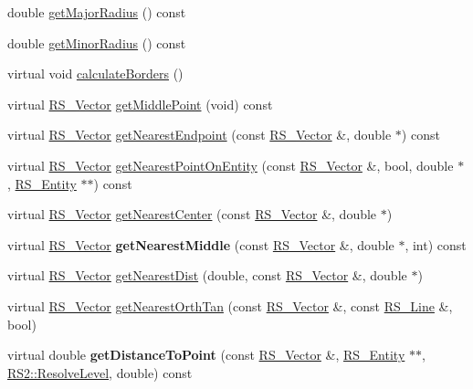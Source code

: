 \begin{DoxyCompactItemize}
\item 
double \hyperlink{classLC__Hyperbola_ae6d62b9293b9de0f4a18c114083c060c}{get\-Major\-Radius} () const 
\item 
double \hyperlink{classLC__Hyperbola_abdc0880b6b9c2dcd4f68156dffd4906f}{get\-Minor\-Radius} () const 
\item 
virtual void \hyperlink{classLC__Hyperbola_a718af461b395258a27b6de2f976ed87e}{calculate\-Borders} ()
\item 
virtual \hyperlink{classRS__Vector}{R\-S\-\_\-\-Vector} \hyperlink{classLC__Hyperbola_ad5b382341417bae845ef0ab55c9908db}{get\-Middle\-Point} (void) const 
\item 
virtual \hyperlink{classRS__Vector}{R\-S\-\_\-\-Vector} \hyperlink{classLC__Hyperbola_adaca6f5f2bb2522a4c504dad6e611583}{get\-Nearest\-Endpoint} (const \hyperlink{classRS__Vector}{R\-S\-\_\-\-Vector} \&, double $\ast$) const 
\item 
virtual \hyperlink{classRS__Vector}{R\-S\-\_\-\-Vector} \hyperlink{classLC__Hyperbola_a1c71e7f4c0221bb03f644028264823f9}{get\-Nearest\-Point\-On\-Entity} (const \hyperlink{classRS__Vector}{R\-S\-\_\-\-Vector} \&, bool, double $\ast$, \hyperlink{classRS__Entity}{R\-S\-\_\-\-Entity} $\ast$$\ast$) const 
\item 
virtual \hyperlink{classRS__Vector}{R\-S\-\_\-\-Vector} \hyperlink{classLC__Hyperbola_ab9a1d8ffb643ab8e0f4f1516b4beafb5}{get\-Nearest\-Center} (const \hyperlink{classRS__Vector}{R\-S\-\_\-\-Vector} \&, double $\ast$)
\item 
\hypertarget{classLC__Hyperbola_a24a99e689222cd41956af9038d6ad8c9}{virtual \hyperlink{classRS__Vector}{R\-S\-\_\-\-Vector} {\bfseries get\-Nearest\-Middle} (const \hyperlink{classRS__Vector}{R\-S\-\_\-\-Vector} \&, double $\ast$, int) const }\label{classLC__Hyperbola_a24a99e689222cd41956af9038d6ad8c9}

\item 
virtual \hyperlink{classRS__Vector}{R\-S\-\_\-\-Vector} \hyperlink{classLC__Hyperbola_a20493a5014ecd93b398ff84ba9731a1a}{get\-Nearest\-Dist} (double, const \hyperlink{classRS__Vector}{R\-S\-\_\-\-Vector} \&, double $\ast$)
\item 
virtual \hyperlink{classRS__Vector}{R\-S\-\_\-\-Vector} \hyperlink{classLC__Hyperbola_aad7a75eae9189d450c30e31d368219d8}{get\-Nearest\-Orth\-Tan} (const \hyperlink{classRS__Vector}{R\-S\-\_\-\-Vector} \&, const \hyperlink{classRS__Line}{R\-S\-\_\-\-Line} \&, bool)
\item 
\hypertarget{classLC__Hyperbola_aa33e1926a4e6f7236c747a43e212f6e8}{virtual double {\bfseries get\-Distance\-To\-Point} (const \hyperlink{classRS__Vector}{R\-S\-\_\-\-Vector} \&, \hyperlink{classRS__Entity}{R\-S\-\_\-\-Entity} $\ast$$\ast$, \hyperlink{classRS2_a1b2c5e3a3e9d1b03a9564229255faa20}{R\-S2\-::\-Resolve\-Level}, double) const }\label{classLC__Hyperbola_aa33e1926a4e6f7236c747a43e212f6e8}


\end{DoxyCompactItemize}
